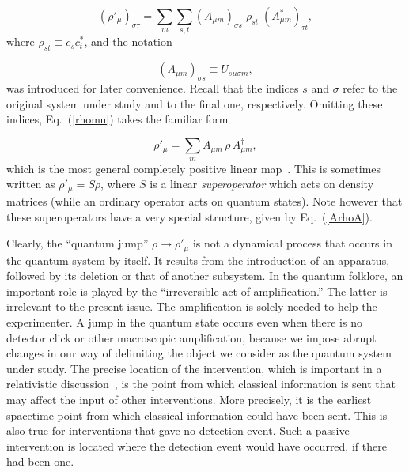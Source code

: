 \documentclass[12pt]{article}
\def\beq{\begin{equation}}
\def\eeq{\end{equation}}
\def\Eq{Eq.~(\ref}
\begin{document}
\beq (\rho'_\mu)_{\sigma\tau}=\sum_{m}\sum_{s,t}
 (A_{\mu m})_{\sigma s}\;\rho_{st}\;(A_{\mu m}^*)_{\tau t},
 \label{rhomu} \eeq
where $\rho_{st}\equiv c_sc_t^*$, and the notation

\beq (A_{\mu m})_{\sigma s}\equiv U_{s\mu\sigma m}, \label{AU}\eeq
was introduced for later convenience. Recall that the indices $s$ and
$\sigma$ refer to the original system under study and to the final one,
respectively. Omitting these indices, \Eq{rhomu}) takes the familiar
form

\beq \rho'_\mu=\sum_{m} A_{\mu m}\,\rho\,A_{\mu m}^\dagger,
 \label{ArhoA} \eeq
which is the most general completely positive linear map~\cite{choi}.
This is sometimes written as $\rho'_\mu=S\rho$, where $S$ is a linear
{\it super\-operator\/} which acts on density matrices (while an
ordinary operator acts on quantum states). Note however that these
super\-operators have a very special structure, given by
Eq.~(\ref{ArhoA}).

Clearly, the ``quantum jump'' $\rho\to\rho'_\mu$ is not a dynamical
process that occurs in the quantum system by itself. It results from the
introduction of an apparatus, followed by its deletion or that of
another subsystem. In the quantum folklore, an important role is played
by the ``irreversible act of amplification.'' The latter is irrelevant
to the present issue. The amplification is solely needed to help the
experimenter. A jump in the quantum state occurs even when there is no
detector click or other macroscopic amplification, because we impose
abrupt changes in our way of delimiting the object we consider as the
quantum system under study. The precise location of the intervention,
which is important in a relativistic discussion~\cite{II}, is the point
from which classical information is sent that may affect the input of
other interventions. More precisely, it is the earliest spacetime point
from which classical information could have been sent. This is also true
for interventions that gave no detection event. Such a passive
intervention is located where the detection event would have occurred,
if there had been one.
\end{document}
